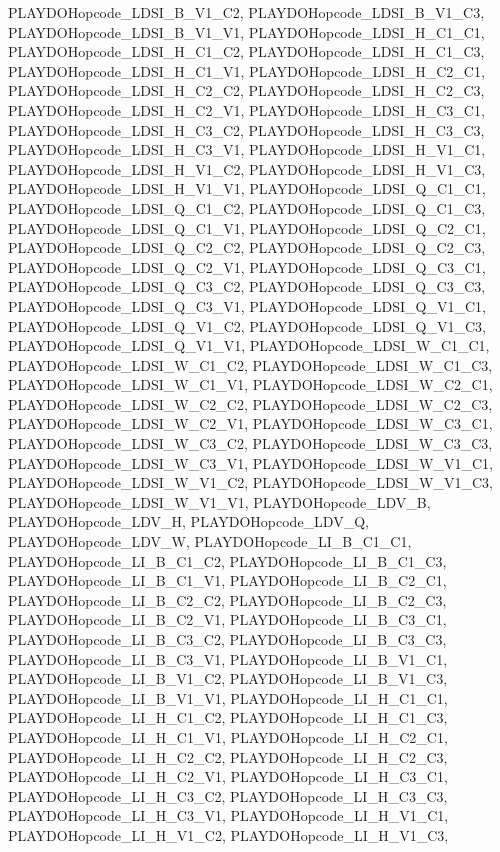 PLAYDOHopcode\_\-LDSI\_\-B\_\-V1\_\-C2, PLAYDOHopcode\_\-LDSI\_\-B\_\-V1\_\-C3, PLAYDOHopcode\_\-LDSI\_\-B\_\-V1\_\-V1, PLAYDOHopcode\_\-LDSI\_\-H\_\-C1\_\-C1, PLAYDOHopcode\_\-LDSI\_\-H\_\-C1\_\-C2, PLAYDOHopcode\_\-LDSI\_\-H\_\-C1\_\-C3, PLAYDOHopcode\_\-LDSI\_\-H\_\-C1\_\-V1, PLAYDOHopcode\_\-LDSI\_\-H\_\-C2\_\-C1, PLAYDOHopcode\_\-LDSI\_\-H\_\-C2\_\-C2, PLAYDOHopcode\_\-LDSI\_\-H\_\-C2\_\-C3, PLAYDOHopcode\_\-LDSI\_\-H\_\-C2\_\-V1, PLAYDOHopcode\_\-LDSI\_\-H\_\-C3\_\-C1, PLAYDOHopcode\_\-LDSI\_\-H\_\-C3\_\-C2, PLAYDOHopcode\_\-LDSI\_\-H\_\-C3\_\-C3, PLAYDOHopcode\_\-LDSI\_\-H\_\-C3\_\-V1, PLAYDOHopcode\_\-LDSI\_\-H\_\-V1\_\-C1, PLAYDOHopcode\_\-LDSI\_\-H\_\-V1\_\-C2, PLAYDOHopcode\_\-LDSI\_\-H\_\-V1\_\-C3, PLAYDOHopcode\_\-LDSI\_\-H\_\-V1\_\-V1, PLAYDOHopcode\_\-LDSI\_\-Q\_\-C1\_\-C1, PLAYDOHopcode\_\-LDSI\_\-Q\_\-C1\_\-C2, PLAYDOHopcode\_\-LDSI\_\-Q\_\-C1\_\-C3, PLAYDOHopcode\_\-LDSI\_\-Q\_\-C1\_\-V1, PLAYDOHopcode\_\-LDSI\_\-Q\_\-C2\_\-C1, PLAYDOHopcode\_\-LDSI\_\-Q\_\-C2\_\-C2, PLAYDOHopcode\_\-LDSI\_\-Q\_\-C2\_\-C3, PLAYDOHopcode\_\-LDSI\_\-Q\_\-C2\_\-V1, PLAYDOHopcode\_\-LDSI\_\-Q\_\-C3\_\-C1, PLAYDOHopcode\_\-LDSI\_\-Q\_\-C3\_\-C2, PLAYDOHopcode\_\-LDSI\_\-Q\_\-C3\_\-C3, PLAYDOHopcode\_\-LDSI\_\-Q\_\-C3\_\-V1, PLAYDOHopcode\_\-LDSI\_\-Q\_\-V1\_\-C1, PLAYDOHopcode\_\-LDSI\_\-Q\_\-V1\_\-C2, PLAYDOHopcode\_\-LDSI\_\-Q\_\-V1\_\-C3, PLAYDOHopcode\_\-LDSI\_\-Q\_\-V1\_\-V1, PLAYDOHopcode\_\-LDSI\_\-W\_\-C1\_\-C1, PLAYDOHopcode\_\-LDSI\_\-W\_\-C1\_\-C2, PLAYDOHopcode\_\-LDSI\_\-W\_\-C1\_\-C3, PLAYDOHopcode\_\-LDSI\_\-W\_\-C1\_\-V1, PLAYDOHopcode\_\-LDSI\_\-W\_\-C2\_\-C1, PLAYDOHopcode\_\-LDSI\_\-W\_\-C2\_\-C2, PLAYDOHopcode\_\-LDSI\_\-W\_\-C2\_\-C3, PLAYDOHopcode\_\-LDSI\_\-W\_\-C2\_\-V1, PLAYDOHopcode\_\-LDSI\_\-W\_\-C3\_\-C1, PLAYDOHopcode\_\-LDSI\_\-W\_\-C3\_\-C2, PLAYDOHopcode\_\-LDSI\_\-W\_\-C3\_\-C3, PLAYDOHopcode\_\-LDSI\_\-W\_\-C3\_\-V1, PLAYDOHopcode\_\-LDSI\_\-W\_\-V1\_\-C1, PLAYDOHopcode\_\-LDSI\_\-W\_\-V1\_\-C2, PLAYDOHopcode\_\-LDSI\_\-W\_\-V1\_\-C3, PLAYDOHopcode\_\-LDSI\_\-W\_\-V1\_\-V1, PLAYDOHopcode\_\-LDV\_\-B, PLAYDOHopcode\_\-LDV\_\-H, PLAYDOHopcode\_\-LDV\_\-Q, PLAYDOHopcode\_\-LDV\_\-W, PLAYDOHopcode\_\-LI\_\-B\_\-C1\_\-C1, PLAYDOHopcode\_\-LI\_\-B\_\-C1\_\-C2, PLAYDOHopcode\_\-LI\_\-B\_\-C1\_\-C3, PLAYDOHopcode\_\-LI\_\-B\_\-C1\_\-V1, PLAYDOHopcode\_\-LI\_\-B\_\-C2\_\-C1, PLAYDOHopcode\_\-LI\_\-B\_\-C2\_\-C2, PLAYDOHopcode\_\-LI\_\-B\_\-C2\_\-C3, PLAYDOHopcode\_\-LI\_\-B\_\-C2\_\-V1, PLAYDOHopcode\_\-LI\_\-B\_\-C3\_\-C1, PLAYDOHopcode\_\-LI\_\-B\_\-C3\_\-C2, PLAYDOHopcode\_\-LI\_\-B\_\-C3\_\-C3, PLAYDOHopcode\_\-LI\_\-B\_\-C3\_\-V1, PLAYDOHopcode\_\-LI\_\-B\_\-V1\_\-C1, PLAYDOHopcode\_\-LI\_\-B\_\-V1\_\-C2, PLAYDOHopcode\_\-LI\_\-B\_\-V1\_\-C3, PLAYDOHopcode\_\-LI\_\-B\_\-V1\_\-V1, PLAYDOHopcode\_\-LI\_\-H\_\-C1\_\-C1, PLAYDOHopcode\_\-LI\_\-H\_\-C1\_\-C2, PLAYDOHopcode\_\-LI\_\-H\_\-C1\_\-C3, PLAYDOHopcode\_\-LI\_\-H\_\-C1\_\-V1, PLAYDOHopcode\_\-LI\_\-H\_\-C2\_\-C1, PLAYDOHopcode\_\-LI\_\-H\_\-C2\_\-C2, PLAYDOHopcode\_\-LI\_\-H\_\-C2\_\-C3, PLAYDOHopcode\_\-LI\_\-H\_\-C2\_\-V1, PLAYDOHopcode\_\-LI\_\-H\_\-C3\_\-C1, PLAYDOHopcode\_\-LI\_\-H\_\-C3\_\-C2, PLAYDOHopcode\_\-LI\_\-H\_\-C3\_\-C3, PLAYDOHopcode\_\-LI\_\-H\_\-C3\_\-V1, PLAYDOHopcode\_\-LI\_\-H\_\-V1\_\-C1, PLAYDOHopcode\_\-LI\_\-H\_\-V1\_\-C2, PLAYDOHopcode\_\-LI\_\-H\_\-V1\_\-C3, 